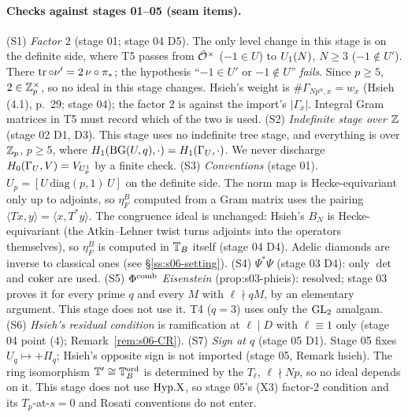 \paragraph{Checks against stages 01--05 (seam items).}
(S1) \emph{Factor $2$} (stage 01; stage 04 D5). The only level change in this stage is on the definite side, where T5 passes from
$\hat{\mathcal{O}}^\times$ ($-1\in U$) to $U_1(N)$, $N\ge3$ ($-1\notin U'$). There $\operatorname{tr}\circ\nu'=2\,\nu\circ\pi_*$; the hypothesis ``$-1\in U'$
or $-1\notin U$'' \emph{fails}. Since $p\ge5$, $2\in\mathbb{Z}_p^\times$, so no ideal in this stage changes. Hsieh's weight is
$\#\Gamma_{Np^\alpha,x}=w_x$ (Hsieh (4.1), p.~29; stage 04); the factor $2$ is against the import's $|\Gamma_x|$. Integral Gram
matrices in T5 must record which of the two is used. 
(S2) \emph{Indefinite stage over $\mathbb{Z}$} (stage 02 D1, D3). This stage uses no indefinite tree stage, and everything is over $\mathbb{Z}_p$,
$p\ge5$, where $H_1(\mathrm{BG}(U,q),\cdot)=H_1(\Gamma_U,\cdot)$. We never discharge $H_0(\Gamma_U,V)=V_{U^1_p}$ by a finite check.
(S3) \emph{Conventions} (stage 01). $U_p=[U\,\mathrm{diag}(p,1)\,U]$ on the definite side. The norm map is Hecke-equivariant only up
to adjoints, so $\eta^B_F$ computed from a Gram matrix uses the pairing $\langle Tx,y\rangle=\langle x,T^*y\rangle$. The congruence
ideal is unchanged: Hsieh's $B_N$ is Hecke-equivariant (the Atkin--Lehner twist turns adjoints into the operators themselves), so
$\eta^B_F$ is computed in $\mathbb{T}_B$ itself (stage 04 D4).  Adelic diamonds are inverse to classical ones (see \S\ref{ss:s06-setting}).
(S4) \emph{$\Psi^*\Psi$} (stage 03 D4): only $\det$ and $\operatorname{coker}$ are used.
(S5) \emph{$\Phi^{\mathrm{comb}}$ Eisenstein} (prop:s03-phieis): resolved; stage 03 proves it for every prime $q$ and every $M$ with
$\ell\nmid qM$, by an elementary argument. This stage does not use it. T4 ($q=3$) uses only the $\mathrm{GL}_2$ amalgam.
(S6) \emph{Hsieh's residual condition} is ramification at $\ell\mid D$ with $\ell\equiv1$ only (stage 04 point (4); Remark~\ref{rem:s06-CR}).
(S7) \emph{Sign at $q$} (stage 05 D1). Stage 05 fixes $U_q\mapsto+\Pi_q$; Hsieh's opposite sign
 is not imported (stage 05, Remark hsieh). The ring isomorphism $\mathbb{T}'\cong\mathbb{T}^{\mathrm{ord}}_B$ is determined
by the $T_\ell$, $\ell\nmid Np$, so no ideal depends on it.  This stage does not use $\mathrm{Hyp.X}$, so stage 05's (X3) factor-2 condition
and its $T_p$-at-$s=0$ and Rosati conventions do not enter.

